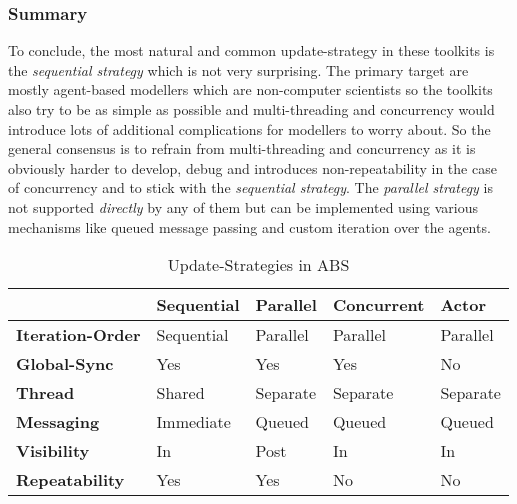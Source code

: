 \subsubsection{Summary}
To conclude, the most natural and common update-strategy in these toolkits is the \textit{sequential strategy} which is not very surprising. The primary target are mostly agent-based modellers which are non-computer scientists so the toolkits also try to be as simple as possible and multi-threading and concurrency would introduce lots of additional complications for modellers to worry about. So the general consensus is to refrain from multi-threading and concurrency as it is obviously harder to develop, debug and introduces non-repeatability in the case of concurrency and to stick with the \textit{sequential strategy}. The \textit{parallel strategy} is not supported \textit{directly} by any of them but can be implemented using various mechanisms like queued message passing and custom iteration over the agents.


\begin{table*}[t]
\centering
\caption{Update-Strategies in ABS}
\label{tab:update_strategies}
\begin{tabular}{l || l | l | l | l }
	 			& \textbf{Sequential} 	& \textbf{Parallel} 	& \textbf{Concurrent}	& \textbf{Actor}  	\\ \hline \hline

\textbf{Iteration-Order}	& Sequential	& Parallel	& Parallel		& Parallel	\\  
\textbf{Global-Sync}		& Yes			& Yes		& Yes			& No		\\  
\textbf{Thread}				& Shared		& Separate	& Separate		& Separate	\\  
\textbf{Messaging}			& Immediate		& Queued	& Queued		& Queued	\\  
\textbf{Visibility}			& In			& Post		& In			& In		\\  
\textbf{Repeatability}		& Yes			& Yes		& No			& No		\\ 

\end{tabular}
\end{table*}